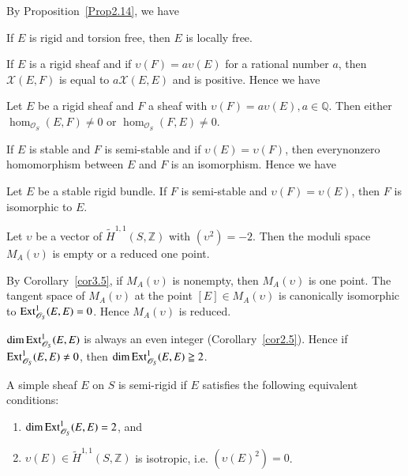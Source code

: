 By Proposition~\ref{Prop2.14}, we have 

\begin{Prop}\label{Prop3.3}
If $E$ is rigid and torsion free, then $E$ is locally free.
\end{Prop}

If $E$ is a rigid sheaf and if $\upsilon(F)=a\upsilon(E)$ for a
rational number $a$, then $\mathcal{X}(E,F)$ is equal to
$a\mathcal{X}(E,E)$ and is positive. Hence we have 

\begin{Prop}\label{Prop3.4}
Let $E$ be a rigid sheaf and $F$ a sheaf with
$\upsilon(F)=a\upsilon(E), a\in \mathbb{Q}$. Then either
$\hom_{\mathscr{O}_S}(E,F)\neq 0$ or $\hom_{\mathscr{O}_S}(F,E)\neq
0$. 
\end{Prop}

If $E$ is stable and $F$ is semi-stable and if
$\upsilon(E)=\upsilon(F)$, then every\pageoriginale nonzero homomorphism between $E$
and $F$ is an isomorphism. Hence we have 

\begin{cor}\label{cor3.5}
Let $E$ be a stable rigid bundle. If $F$ is semi-stable and
$\upsilon(F)=\upsilon(E)$, then $F$ is isomorphic to $E$. 
\end{cor}

\begin{cor}\label{cor3.6}
Let $\upsilon$ be a vector of $\widetilde{H}^{1,1}(S,\mathbb{Z})$ with
$\left(\upsilon^{2}\right)=-2$. Then the moduli space $M_A(\upsilon)$
is empty or a reduced one point. 
\end{cor}

\begin{Proof}
By Corollary~\ref{cor3.5}, if $M_A(\upsilon)$ is nonempty, then
$M_A(\upsilon)$ is one point. The tangent space of $M_A(\upsilon)$ at
the point $[E]\in M_A(\upsilon)$ is canonically isomorphic to
$\mathrm{Ext}^{1}_{\mathscr{O}_S}(E,E)=0$. Hence $M_A(\upsilon)$ is reduced.
\enprf
\end{Proof}

$\dim\mathrm{Ext}^{1}_{\mathscr{O}_S}(E,E)$ is always an even integer
(Corollary~\ref{cor2.5}). Hence if $\mathrm{Ext}^{1}_{\mathscr{O}_S}(E,E)\neq
0$, then $\dim\mathrm{Ext}^{1}_{\mathscr{O}_S}(E,E)\geqq 2$.

\begin{dfn}\label{dfn3.7}
A simple sheaf $E$ on $S$ is semi-rigid if $E$ satisfies the following
equivalent conditions: 
\begin{enumerate}
\renewcommand{\labelenumi}{(\theenumi)}
\item $\dim\mathrm{Ext}^{1}_{\mathscr{O}_S}(E,E)=2$, and 
\item $\upsilon(E)\in \widetilde{H}^{1,1}(S,\mathbb{Z})$ is isotropic,
i.e. $\left(\upsilon(E)^{2}\right)=0$. 
\end{enumerate}
\end{dfn}

